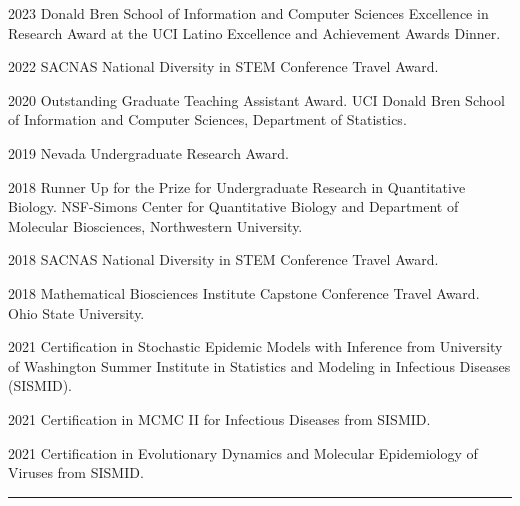 \documentclass{article}
\begin{document}


\begin{description}
	\vspace{-2mm}
	\item[Awards]\hspace*{.1in}
	
		2023 Donald Bren School of Information and Computer Sciences Excellence in Research Award at the UCI Latino Excellence and Achievement Awards Dinner.
		\vspace*{1mm}
	
		2022 SACNAS National Diversity in STEM Conference Travel Award.
		\vspace*{1mm}
	
		2020 Outstanding Graduate Teaching Assistant Award. UCI Donald Bren School of Information and Computer Sciences, Department of Statistics.
		\vspace*{1mm}
		
		2019 Nevada Undergraduate Research Award.
		\vspace*{1mm}
		
		2018 Runner Up for the Prize for Undergraduate Research in Quantitative Biology. NSF-Simons Center for Quantitative Biology and Department of Molecular Biosciences, Northwestern University.
		\vspace*{1mm}
		
		2018 SACNAS National Diversity in STEM Conference Travel Award.
		\vspace*{1mm}
		
		2018 Mathematical Biosciences Institute Capstone Conference Travel Award. Ohio State University.
	
\end{description}




\begin{description}
	\vspace{-2mm}
	\item[Certifications]\hspace*{.01in}
	
		2021 Certification in Stochastic Epidemic Models with Inference from University of Washington Summer Institute in Statistics and Modeling in Infectious Diseases (SISMID).
		\vspace*{1mm}
		
		2021 Certification in MCMC II for Infectious Diseases from SISMID.
		\vspace*{1mm}
		
		2021 Certification in Evolutionary Dynamics and Molecular Epidemiology of Viruses from SISMID.
	
\end{description}
\vspace{-2mm}
\rule{\linewidth}{1pt}
\end{document}
